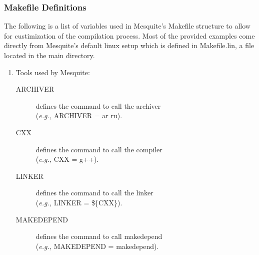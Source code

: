 \documentclass[psfig]{article}
\begin{document}
\subsubsection{Makefile Definitions}
The following is a list of variables used in Mesquite's Makefile
structure to allow for custimization of the compilation process.
Most of the provided examples come directly from Mesquite's default
linux setup which is defined in Makefile.lin, a file located in
the main directory.
\label{mes_vars_and_defs}
\begin{enumerate}

\item Tools used by Mesquite:
  \begin{description}
  \item[ARCHIVER] defines the command to call the archiver\\
    	({\it e.g.,} ARCHIVER = ar ru).
  \item[CXX] defines the command to call the compiler\\
	({\it e.g.,} CXX = g++).
  \item [LINKER] defines the command to call the linker\\
	({\it e.g.,} LINKER = \$\{CXX\}).
  \item[MAKEDEPEND] defines the command to call makedepend\\
	({\it e.g.,} MAKEDEPEND = makedepend).
  \end{description}


\end{enumerate}
\end{document}

